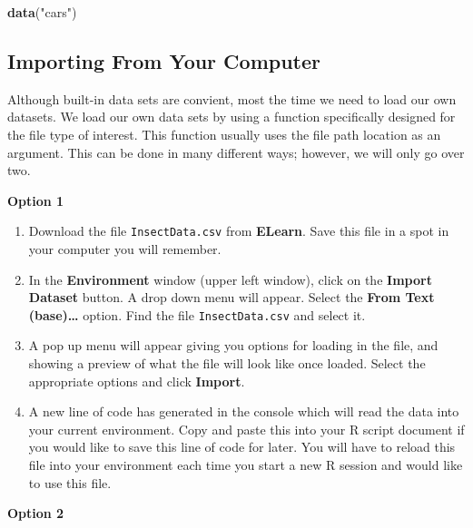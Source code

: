 \documentclass[
]{book}
\newenvironment{Shaded}{\begin{snugshade}}{\end{snugshade}}
\newcommand{\KeywordTok}[1]{\textcolor[rgb]{0.13,0.29,0.53}{\textbf{#1}}}
\newcommand{\NormalTok}[1]{#1}
\newcommand{\StringTok}[1]{\textcolor[rgb]{0.31,0.60,0.02}{#1}}
\begin{document}
\begin{Shaded}
\begin{Highlighting}[]
\KeywordTok{data}\NormalTok{(}\StringTok{"cars"}\NormalTok{)}
\end{Highlighting}
\end{Shaded}

\hypertarget{importing-from-your-computer}{%
\subsection*{Importing From Your Computer}\label{importing-from-your-computer}}

Although built-in data sets are convient, most the time we need to load our own datasets. We load our own data sets by using a function specifically designed for the file type of interest. This function usually uses the file path location as an argument. This can be done in many different ways; however, we will only go over two.

\textbf{Option 1}

\begin{enumerate}
\def\labelenumi{\arabic{enumi})}
\item
  Download the file \texttt{InsectData.csv} from \textbf{ELearn}. Save this file in a spot in your computer you will remember.
\item
  In the \textbf{Environment} window (upper left window), click on the \textbf{Import Dataset} button. A drop down menu will appear. Select the \textbf{From Text (base)\ldots{}} option. Find the file \texttt{InsectData.csv} and select it.
\item
  A pop up menu will appear giving you options for loading in the file, and showing a preview of what the file will look like once loaded. Select the appropriate options and click \textbf{Import}.
\item
  A new line of code has generated in the console which will read the data into your current environment. Copy and paste this into your R script document if you would like to save this line of code for later. You will have to reload this file into your environment each time you start a new R session and would like to use this file.
\end{enumerate}

\textbf{Option 2}
\end{document}

